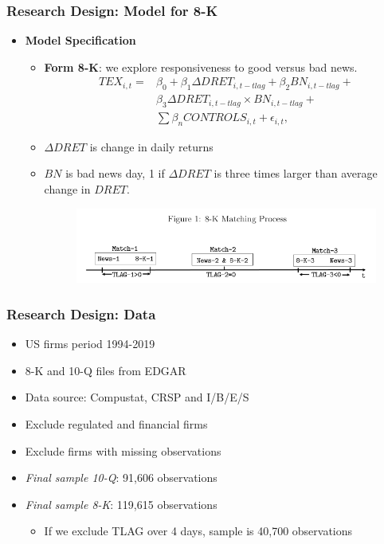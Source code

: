 \documentclass{beamer}
\begin{document}
\begin{frame}
\frametitle{Research Design: Model for 8-K}
\begin{itemize}
	
	\item \textbf{Model Specification}
	\begin{itemize}
	
		\item \textbf{Form 8-K}: we explore responsiveness to good versus bad news.
		\begin{equation}
		\begin{aligned}
		\label{eq2}
		TEX_{i,t}=
		&\beta_0+\beta_1\Delta DRET_{i,t-tlag}+\beta_2BN_{i,t-tlag}+\\
		&\beta_3\Delta DRET_{i,t-tlag}\times BN_{i,t-tlag}+\\
		&\sum\beta_nCONTROLS_{i,t}+\epsilon_{i,t},
		\end{aligned}
		\end{equation}
		
		\pause
				\item $\Delta DRET$ is change in daily returns
				\item $BN$ is bad news day, 1 if $\Delta DRET$ is three times larger than average change in $DRET$.
		
		\begin{figure}[h]
			\centering
			\includegraphics[width=1\linewidth]{fig1}
			\label{fig1}
		\end{figure}
	\end{itemize}
	
\end{itemize}
\end{frame}
\begin{frame}
\frametitle{Research Design: Data}

\begin{itemize}
	\item US firms period 1994-2019
	\item 8-K and 10-Q files from EDGAR
	\item Data source: Compustat, CRSP and I/B/E/S
	\item Exclude regulated and financial firms
	\item Exclude firms with missing observations

\medskip	\pause
	\item \textit{Final sample 10-Q}: 91,606	observations


\medskip	\pause
	\item \textit{Final sample 8-K}: 119,615	observations	
	\begin{itemize}
	\item If we exclude TLAG over 4 days, sample is 40,700 observations
	\end{itemize}
	
\end{itemize}
\end{frame}
\end{document}
